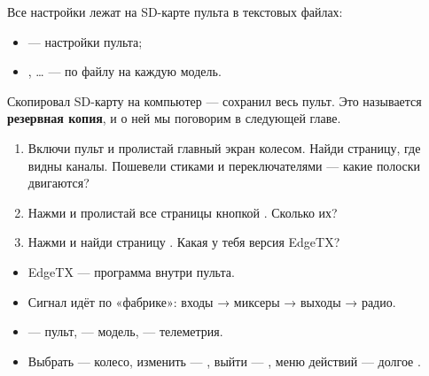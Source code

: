 Все настройки лежат на SD-карте пульта в текстовых файлах:
\begin{itemize}
  \item {} --- настройки пульта;
  \item {},  … --- по файлу на каждую модель.
\end{itemize}
Скопировал SD-карту на компьютер --- сохранил весь пульт. Это называется
\textbf{резервная копия}, и о ней мы поговорим в следующей главе.

\begin{tryit}
\begin{enumerate}
  \item Включи пульт и пролистай главный экран колесом. Найди страницу, где видны каналы.
        Пошевели стиками и переключателями --- какие полоски двигаются?
  \item Нажми  и пролистай все страницы кнопкой . Сколько их?
  \item Нажми  и найди страницу . Какая у тебя версия EdgeTX?
\end{enumerate}
\end{tryit}

\begin{summary}
\begin{itemize}
  \item EdgeTX --- программа внутри пульта.
  \item Сигнал идёт по «фабрике»: входы → миксеры → выходы → радио.
  \item {} --- пульт,  --- модель,  --- телеметрия.
  \item Выбрать --- колесо, изменить --- , выйти --- ,
        меню действий --- долгое .
\end{itemize}
\end{summary}
